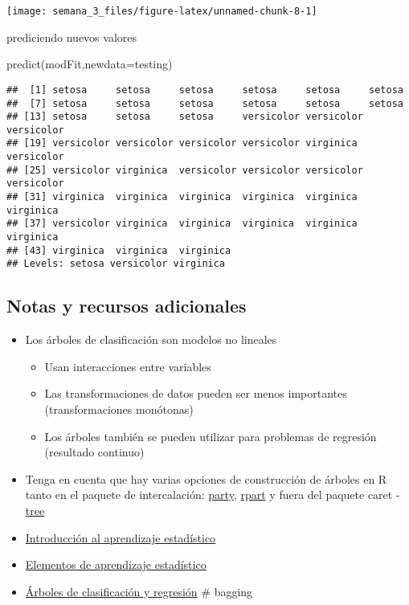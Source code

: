 \documentclass[
]{article}
\newenvironment{Shaded}{\begin{snugshade}}{\end{snugshade}}
\newcommand{\AttributeTok}[1]{\textcolor[rgb]{0.77,0.63,0.00}{#1}}
\newcommand{\FunctionTok}[1]{\textcolor[rgb]{0.00,0.00,0.00}{#1}}
\newcommand{\NormalTok}[1]{#1}
\providecommand{\tightlist}{%
  \setlength{\itemsep}{0pt}\setlength{\parskip}{0pt}}
\begin{document}
\begin{center}\texttt{[image: semana\_3\_files/figure-latex/unnamed-chunk-8-1]} \end{center}

prediciendo nuevos valores

\begin{Shaded}
\begin{Highlighting}[]
\FunctionTok{predict}\NormalTok{(modFit,}\AttributeTok{newdata=}\NormalTok{testing)}
\end{Highlighting}
\end{Shaded}

\begin{verbatim}
##  [1] setosa     setosa     setosa     setosa     setosa     setosa    
##  [7] setosa     setosa     setosa     setosa     setosa     setosa    
## [13] setosa     setosa     setosa     versicolor versicolor versicolor
## [19] versicolor versicolor versicolor versicolor virginica  versicolor
## [25] versicolor virginica  versicolor versicolor versicolor versicolor
## [31] virginica  virginica  virginica  virginica  virginica  virginica 
## [37] versicolor virginica  virginica  virginica  virginica  virginica 
## [43] virginica  virginica  virginica 
## Levels: setosa versicolor virginica
\end{verbatim}

\hypertarget{notas-y-recursos-adicionales}{%
\subsection{Notas y recursos
adicionales}\label{notas-y-recursos-adicionales}}

\begin{itemize}
\tightlist
\item
  Los árboles de clasificación son modelos no lineales

  \begin{itemize}
  \tightlist
  \item
    Usan interacciones entre variables
  \item
    Las transformaciones de datos pueden ser menos importantes
    (transformaciones monótonas)
  \item
    Los árboles también se pueden utilizar para problemas de regresión
    (resultado continuo)
  \end{itemize}
\item
  Tenga en cuenta que hay varias opciones de construcción de árboles en
  R tanto en el paquete de intercalación:
  \href{http://cran.r-project.org/web/packages/party/index.html}{party},
  \href{http://cran.r-project.org/web/packages/rpart/index.html}{rpart}
  y fuera del paquete caret -
  \href{http://cran.r-project.org/web/packages/tree/index.html}{tree}
\item
  \href{http://www-bcf.usc.edu/~gareth/ISL/}{Introducción al aprendizaje
  estadístico}
\item
  \href{http://www-stat.stanford.edu/~tibs/ElemStatLearn/}{Elementos de
  aprendizaje estadístico}
\item
  \href{http://www.amazon.com/Classification-Regression-Trees-Leo-Breiman/dp/0412048418}{Árboles
  de clasificación y regresión} \# bagging
\end{itemize}
\end{document}
